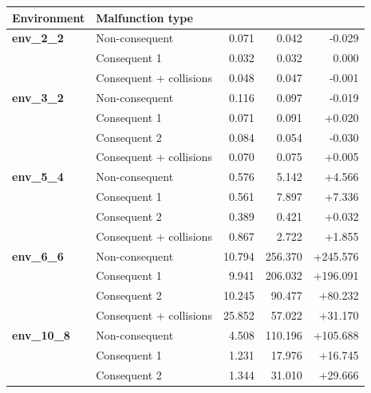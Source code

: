 \documentclass[runningheads]{llncs}
\begin{document}
\begin{table}[hbtp]
	\centering
	\footnotesize
	\setlength{\tabcolsep}{4pt}
	\renewcommand{\arraystretch}{0.9}
	\begin{tabular}{@{}llrrr@{}}
		\toprule
		\textbf{Environment} &
		\textbf{Malfunction type} &
		\makecell[r]{\textbf{heuristic}} &
		\makecell[r]{\textbf{~~no heuristic}} &
		\makecell[r]{\textbf{$\Delta T_{\mathrm{res}}$}} \\
		\midrule

		\textbf{env\_2\_2}
		& Non-consequent & 0.071 & 0.042 & -0.029 \\
		& Consequent 1 & 0.032 & 0.032 & 0.000 \\
		& Consequent + collisions & 0.048 & 0.047 & -0.001 \\
		
		\midrule
		
		\textbf{env\_3\_2}
		& Non-consequent & 0.116 & 0.097 & -0.019 \\
		& Consequent 1 & 0.071 & 0.091 & +0.020 \\
		& Consequent 2 & 0.084 & 0.054 & -0.030 \\
		& Consequent + collisions & 0.070 & 0.075 & +0.005 \\
		
		\midrule
		
		\textbf{env\_5\_4}
		& Non-consequent & 0.576 & 5.142 & +4.566 \\
		& Consequent 1 & 0.561 & 7.897 & +7.336 \\
		& Consequent 2 & 0.389 & 0.421 & +0.032 \\
		& Consequent + collisions & 0.867 & 2.722 & +1.855 \\
		
		\midrule
		
		\textbf{env\_6\_6}
		& Non-consequent & 10.794 & 256.370 & +245.576 \\
		& Consequent 1 & 9.941 & 206.032 & +196.091 \\
		& Consequent 2 & 10.245 & 90.477 & +80.232 \\
		& Consequent + collisions & 25.852 & 57.022 & +31.170 \\

		\midrule
		
		\textbf{env\_10\_8}
		& Non-consequent & 4.508 & 110.196 & +105.688 \\
		& Consequent 1 & 1.231 & 17.976 & +16.745 \\
		& Consequent 2 & 1.344 & 31.010 & +29.666 \\
		

\end{tabular}
\end{table}
\end{document}
